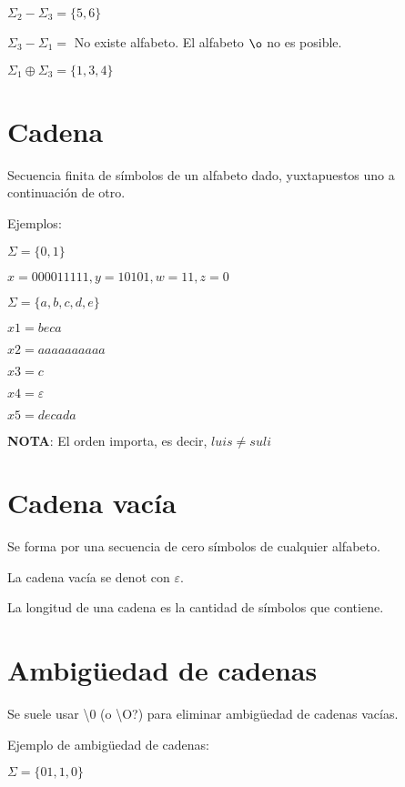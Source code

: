 \documentclass{article}
\begin{document}
$\Sigma_2 - \Sigma_3 = \{5, 6\}$

$\Sigma_3 - \Sigma_1 =$ No existe alfabeto. El alfabeto $\o$ no es posible.

$\Sigma_1 \oplus \Sigma_3 = \{1, 3, 4\}$

\section{Cadena}

Secuencia finita de símbolos de un alfabeto dado, yuxtapuestos uno a continuación
de otro.
\vspace{1em}

Ejemplos:
\vspace{1em}

$\Sigma = \{0, 1\}$

$x = 000011111, y = 10101, w = 11, z = 0$
\vspace{1em}

$\Sigma = \{a, b, c, d, e\}$

$x1 = beca$

$x2 = aaaaaaaaaa$

$x3 = c$

$x4 = \varepsilon$

$x5 = decada$
\vspace{1em}

\textbf{NOTA}: El orden importa, es decir, $luis \ne suli$

\section{Cadena vacía}

Se forma por una secuencia de cero símbolos de cualquier alfabeto.

La cadena vacía se denot con $\varepsilon$.

La longitud de una cadena es la cantidad de símbolos que contiene.

\section{Ambigüedad de cadenas}

Se suele usar \textbackslash 0 (o \textbackslash O?) para eliminar ambigüedad de cadenas vacías.
\vspace{1em}

Ejemplo de ambigüedad de cadenas:
\vspace{1em}

$\Sigma = \{01, 1, 0\}$
\end{document}

